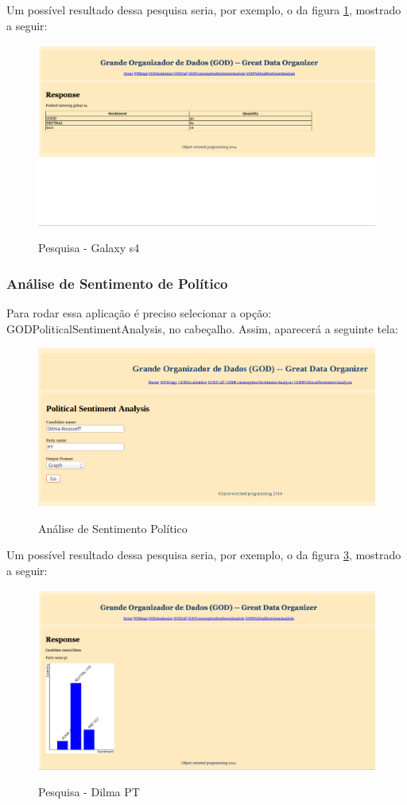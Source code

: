 Um possível resultado dessa pesquisa seria, por exemplo, o da figura \ref{fig:cons-result}, mostrado a seguir:

\begin{figure}[h]
\caption{Pesquisa - Galaxy s4}
\centering
\includegraphics[width=14cm]{figures/consumo-resultado.png}
\label{fig:cons-result}
\end{figure}

\subsubsection{Análise de Sentimento de Político}
Para rodar essa aplicação é preciso selecionar a opção: GODPoliticalSentimentAnalysis, no cabeçalho. Assim, aparecerá a seguinte tela:

\begin{figure}[h]
\caption{Análise de Sentimento Político}
\centering
\includegraphics[width=14cm]{figures/politico-pesquisa.png}
\label{fig:pol-pesq}
\end{figure}

Um possível resultado dessa pesquisa seria, por exemplo, o da figura \ref{fig:pol-result}, mostrado a seguir:

\begin{figure}[h]
\caption{Pesquisa - Dilma PT}
\centering
\includegraphics[width=14cm]{figures/politico-resultado.png}
\label{fig:pol-result}
\end{figure}
